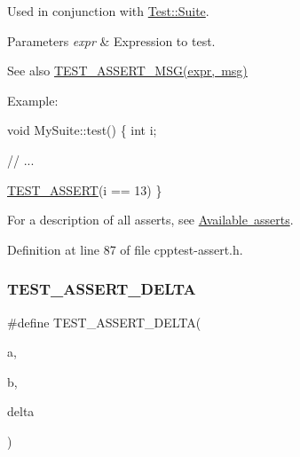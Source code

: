 Used in conjunction with \mbox{\hyperlink{class_test_1_1_suite}{Test\+::\+Suite}}.


\begin{DoxyParams}{Parameters}
{\em expr} & Expression to test.\\
\hline
\end{DoxyParams}
\begin{DoxySeeAlso}{See also}
\mbox{\hyperlink{cpptest-assert_8h_ac612ede938734f9c8d898e05818882fb}{T\+E\+S\+T\+\_\+\+A\+S\+S\+E\+R\+T\+\_\+\+M\+S\+G(expr, msg)}}
\end{DoxySeeAlso}
\begin{DoxyParagraph}{Example\+:}

\begin{DoxyCode}
\textcolor{keywordtype}{void} MySuite::test()
\{
    \textcolor{keywordtype}{int} i;

    \textcolor{comment}{// ...}

    \mbox{\hyperlink{cpptest-assert_8h_a29a763f14098f5574ae5c68291dc6ddd}{TEST\_ASSERT}}(i == 13)
\}
\end{DoxyCode}

\end{DoxyParagraph}
For a description of all asserts, see \mbox{\hyperlink{asserts}{Available asserts}}. 

Definition at line 87 of file cpptest-\/assert.\+h.

\mbox{\label{cpptest-assert_8h_a9583b1709f4b9dfb3ff2849bfec5c885}} 
\subsubsection{\texorpdfstring{T\+E\+S\+T\+\_\+\+A\+S\+S\+E\+R\+T\+\_\+\+D\+E\+L\+TA}{TEST\_ASSERT\_DELTA}}
{\footnotesize\ttfamily \#define T\+E\+S\+T\+\_\+\+A\+S\+S\+E\+R\+T\+\_\+\+D\+E\+L\+TA(\begin{DoxyParamCaption}\item[{}]{a,  }\item[{}]{b,  }\item[{}]{delta }\end{DoxyParamCaption})}

